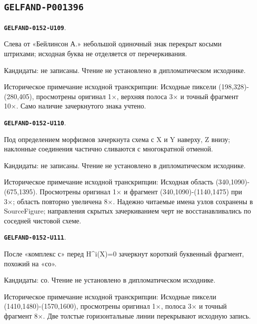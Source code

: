 \documentclass[11pt]{article}
\theoremstyle{definition}
\theoremstyle{remark}
\begin{document}
\subsection*{\texttt{GELFAND-P001396}}
\par\noindent\leavevmode{}\label{GELFAND-0152-U109}\label{GELFAND-P001396:heading-cancellation:note}\textbf{\texttt{GELFAND-0152-U109}}.\nopagebreak[4]\par
Слева от «Бейлинсон А.» небольшой одиночный знак перекрыт косыми штрихами; исходная буква не отделяется от перечеркивания.\par
Кандидаты: не записаны. Чтение не установлено в дипломатическом исходнике.\par
Историческое примечание исходной транскрипции: Исходные пиксели (198,328)-(280,405), просмотрены оригинал 1×, верхняя полоса 3× и точный фрагмент 10×. Само наличие зачеркнутого знака учтено.\par\medskip
\par\noindent\leavevmode{}\label{GELFAND-0152-U110}\label{GELFAND-P001396:roof-cancellation:note}\textbf{\texttt{GELFAND-0152-U110}}.\nopagebreak[4]\par
Под определением морфизмов зачеркнута схема с X и Y наверху, Z внизу; наклонные соединения частично сливаются с многократной отменой.\par
Кандидаты: не записаны. Чтение не установлено в дипломатическом исходнике.\par
Историческое примечание исходной транскрипции: Исходная область (340,1090)-(675,1395). Просмотрены оригинал 1× и фрагмент (340,1090)-(1140,1475) при 3×; область повторно увеличена 8×. Надежно читаемые имена узлов сохранены в SourceFigure; направления скрытых зачеркиванием черт не восстанавливались по соседней чистовой схеме.\par\medskip
\par\noindent\leavevmode{}\label{GELFAND-0152-U111}\label{GELFAND-P001396:example-cancellation:note}\textbf{\texttt{GELFAND-0152-U111}}.\nopagebreak[4]\par
После «комплекс с» перед H\textasciicircum{}i(X)=0 зачеркнут короткий буквенный фрагмент, похожий на «со».\par
Кандидаты: со. Чтение не установлено в дипломатическом исходнике.\par
Историческое примечание исходной транскрипции: Исходные пиксели (1410,1480)-(1570,1600), просмотрены оригинал 1×, полоса 3× и точный фрагмент 8×. Две толстые горизонтальные линии перекрывают исходную запись.\par\medskip
\end{document}
